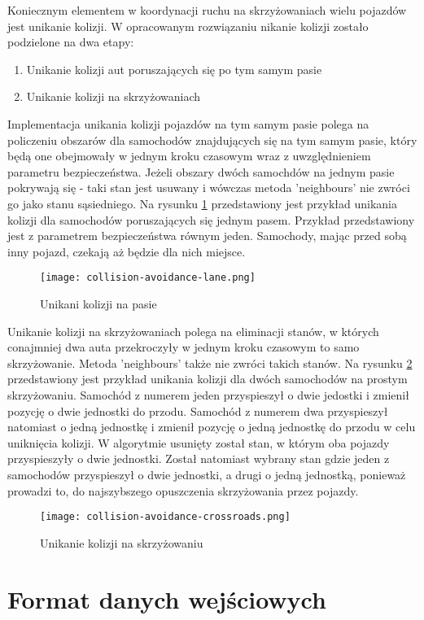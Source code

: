 Koniecznym elementem w koordynacji ruchu na skrzyżowaniach wielu pojazdów jest unikanie kolizji. W opracowanym rozwiązaniu nikanie kolizji zostało podzielone na dwa etapy:
\begin{enumerate}
\item Unikanie kolizji aut poruszających się po tym samym pasie
\item Unikanie kolizji na skrzyżowaniach
\end{enumerate}
Implementacja unikania kolizji pojazdów na tym samym pasie polega na policzeniu obszarów dla samochodów znajdujących się na tym samym pasie, który będą one obejmowały w jednym kroku czasowym wraz z uwzględnieniem parametru bezpieczeństwa. Jeżeli obszary dwóch samochdów na jednym pasie pokrywają się - taki stan jest usuwany i wówczas metoda 'neighbours' nie zwróci go jako stanu sąsiedniego. Na rysunku \ref{collision-avoidance-lane} przedstawiony jest przykład unikania kolizji dla samochodów poruszających się jednym pasem. Przykład przedstawiony jest z parametrem bezpieczeństwa równym jeden. Samochody, mając przed sobą inny pojazd, czekają aż będzie dla nich miejsce.
\begin{figure}
    \texttt{[image: collision-avoidance-lane.png]}
  \caption{Unikani kolizji na pasie}
  \label{collision-avoidance-lane}
\end{figure}
\newpage
Unikanie kolizji na skrzyżowaniach polega na eliminacji stanów, w których conajmniej dwa auta przekroczyły w jednym kroku czasowym to samo skrzyżowanie. Metoda 'neighbours' także nie zwróci takich stanów. Na rysunku \ref{collision-avoidance-crossroads} przedstawiony jest przykład unikania kolizji dla dwóch samochodów na prostym skrzyżowaniu. Samochód z numerem jeden przyspieszył o dwie jedostki i zmienił pozycję o dwie jednostki do przodu. Samochód z numerem dwa przyspieszył natomiast o jedną jednostkę i zmienił pozycję o jedną jednostkę do przodu w celu uniknięcia kolizji. W algorytmie usunięty został stan, w którym oba pojazdy przyspieszyły o dwie jednostki. Został natomiast wybrany stan gdzie jeden z samochodów przyspieszył o dwie jednostki, a drugi o jedną jednostką, ponieważ prowadzi to, do najszybszego opuszczenia skrzyżowania przez pojazdy.
\begin{figure}
    \texttt{[image: collision-avoidance-crossroads.png]}
  \caption{Unikanie kolizji na skrzyżowaniu}
  \label{collision-avoidance-crossroads}
\end{figure}
\newpage

\section{Format danych wejściowych}

